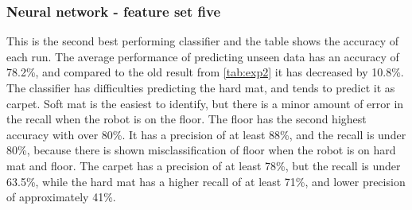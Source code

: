 \documentclass[USenglish]{ifimaster}  %
\begin{document}
\subsubsection{Neural network - feature set five}
This is the second best performing classifier and the table shows the accuracy of each run. The average performance of predicting unseen data has an accuracy of 78.2\%, and compared to the old result from \ref{tab:exp2} it has decreased by 10.8\%. The classifier has difficulties predicting the hard mat, and tends to predict it as carpet. Soft mat is the easiest to identify, but there is a minor amount of error in the recall when the robot is on the floor. The floor has the second highest accuracy with over 80\%. It has a precision of at least 88\%, and the recall is under 80\%, because there is shown misclassification of floor when the robot is on hard mat and floor. The carpet has a precision of at least 78\%, but the recall is under 63.5\%, while the hard mat has a higher recall of at least 71\%, and lower precision of approximately 41\%.
\end{document}
